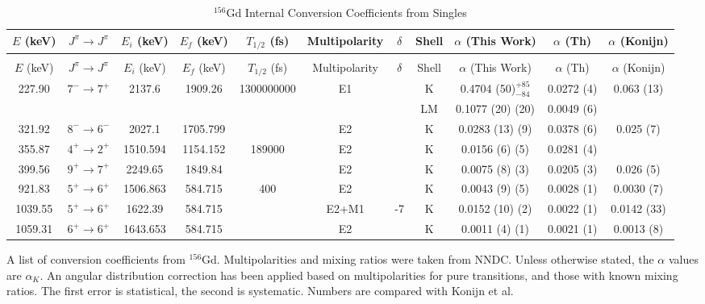 \begin{landscape}
    \begin{longtable}{c|c|c|c|c|c|c|c|c|c|c}
    \caption{$^{156}$Gd Internal Conversion Coefficients from Singles}
        \label{tab:156Gd_Single_ICC_Corr}\\
    \toprule
$E$ (keV)	&	$J^{\pi}	\rightarrow	J^{\pi}$	&	$E_i$ (keV)	&	$E_f$ (keV)	&	$T_{1/2}$ (fs)	&	Multipolarity	&	$\delta$	& Shell &	$\alpha$ (This Work)	&	$\alpha$  (Th)	&	$\alpha$ (Konijn)	\\
\hline		
\endfirsthead
    \caption[]{$^{156}$Gd Internal Conversion Coefficients from Singles}\\
    \toprule
$E$ (keV)	&	$J^{\pi}	\rightarrow	J^{\pi}$	&	$E_i$ (keV)	&	$E_f$ (keV)	&	$T_{1/2}$ (fs)	&	Multipolarity	&	$\delta$ & Shell &	$\alpha$ (This Work)	&	$\alpha$  (Th)	&	$\alpha$ (Konijn)	\\
\hline		
\endhead
227.90	&	$7^-	\rightarrow 7^+$	&	2137.6	&	1909.26	&	1300000000	&	E1	&	& K	&	0.4704 (50)$^{+85}_{-84}$	&	0.0272 (4)	&	0.063 (13)	\\
	&			&		&		&		&		&	& LM	&	0.1077 (20) (20)	&	0.0049 (6)	&		\\ \hline
321.92	&	$8^-	\rightarrow	6^-$	&	2027.1	&	1705.799	&		&	E2	&		& K &	0.0283 (13) (9)	&	0.0378 (6)	&	0.025 (7)	\\ \hline
355.87	&	$4^+	\rightarrow	2^+$	&	1510.594	&	1154.152	&	189000	&	E2	&		& K &	0.0156 (6) (5)	&	0.0281 (4)	&	\\ \hline
399.56	&	$9^+	\rightarrow	7^+$	&	2249.65	&	1849.84	&		&	E2	&		& K &	0.0075 (8) (3)	&	0.0205 (3)	&	0.026 (5)	\\ \hline
921.83	&	$5^+	\rightarrow	6^+$	&	1506.863	&	584.715	&	400	&	E2	&		& K &	0.0043 (9) (5) &	0.0028 (1)	&	0.0030 (7)	\\ \hline
1039.55	&	$5^+	\rightarrow	6^+$	&	1622.39	&	584.715	&		&	E2+M1	&	-7	& K &	0.0152 (10) (2)	&	0.0022 (1)	&	0.0142 (33)	\\ \hline
1059.31	&	$6^+	\rightarrow	6^+$	&	1643.653	&	584.715	&		&	E2	&		& K &	0.0011 (4) (1)	&	0.0021 (1)	&	0.0013 (8)	\\ \bottomrule
    \end{longtable}
    \caption{A list of conversion coefficients from $^{156}$Gd. Multipolarities and mixing ratios were taken from NNDC. Unless otherwise stated, the $\alpha$ values are $\alpha_K$. An angular distribution correction has been applied based on multipolarities for pure transitions, and those with known mixing ratios. The first error is statistical, the second is systematic. Numbers are compared with Konijn et al. \citep{konjin81:_156gd}}
\end{landscape}